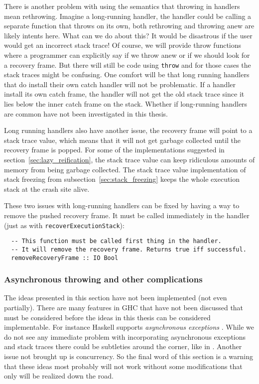 There is another problem with using the semantics that throwing in
handlers mean rethrowing. Imagine a long-running handler, the handler
could be calling a separate function that throws on its own, both
rethrowing and throwing anew are likely intents here. What can we
do about this? It would be disastrous if the
user would get an incorrect stack trace! Of course, we will provide
throw functions where a programmer can explicitly say if we throw anew
or if we should look for a recovery frame. But there will still be code
using \texttt{throw} and for those cases the stack traces might be
confusing. One comfort will be that long running handlers that do
install their own catch handler will not be problematic. If a handler install its
own catch frame, the handler will not get the old stack trace
since it lies below the inner catch frame on the stack.
Whether if long-running handlers are common have not been investigated
in this thesis.

Long running handlers also have another issue, the
recovery frame will point to a stack trace value, which means that it
will not get garbage collected until the recovery frame is
popped. For some of the implementations suggested in section~\ref{sec:lazy_reification}, the stack trace value can keep ridiculous
amounts of memory from being garbage collected. The stack trace value
implementation of stack freezing from subsection~\ref{sec:stack_freezing} keeps the whole execution stack at the crash
site alive.

These two issues with long-running handlers can be fixed by having a
way to remove the pushed recovery frame. It must be called immediately
in the handler (just as with \texttt{recoverExecutionStack}):

\begin{verbatim}
  -- This function must be called first thing in the handler.
  -- It will remove the recovery frame. Returns true iff successful.
  removeRecoveryFrame :: IO Bool
\end{verbatim}

\subsubsection{Asynchronous throwing and other complications}

The ideas presented in this section have not been implemented (not
even partially). There are many features in GHC that have not been
discussed that must be considered before the ideas in this thesis
can be considered implementable. For instance Haskell supports
\emph{asynchronous exceptions} \cite{marlow2001asynchronous}. While
we do not see any immediate problem with incorporating asynchronous
exceptions and stack traces there could be subtleties around the corner,
like in \cite{edsko_dark_corners_of_throwTo}. Another issue not brought
up is concurrency. So the final word of this section is a warning that
these ideas most probably will not work without some modifications that
only will be realized down the road.
